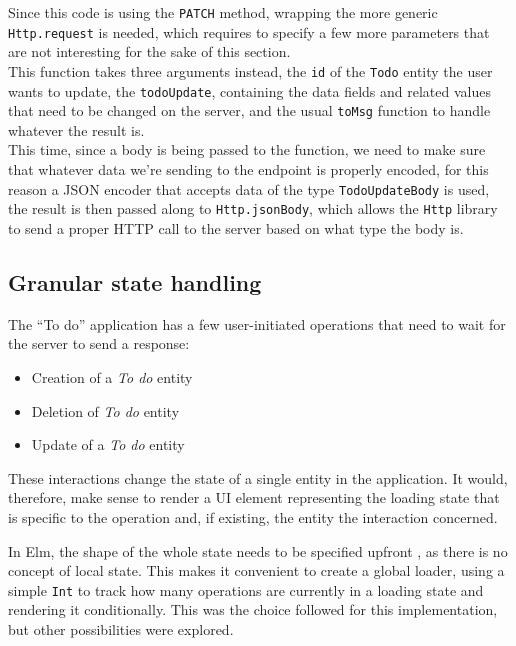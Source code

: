 \begin{sloppypar}
Since this code is using the \texttt{PATCH} method, wrapping the more generic \texttt{Http.request} is needed, which requires to specify a few more parameters that are not interesting for the sake of this section.\\
This function takes three arguments instead, the \texttt{id} of the \texttt{Todo} entity the user wants to update, the \texttt{todoUpdate}, containing the data fields and related values that need to be changed on the server, and the usual \texttt{toMsg} function to handle whatever the result is.\\
This time, since a body is being passed to the function, we need to make sure that whatever data we're sending to the endpoint is properly encoded, for this reason a JSON encoder that accepts data of the type \texttt{TodoUpdateBody} is used, the result is then passed along to \texttt{Http.jsonBody}, which allows the \texttt{Http} library to send a proper HTTP call to the server based on what type the body is.
\end{sloppypar}

\subsection{Granular state handling}
The ``To do'' application has a few user-initiated operations that need to wait for the server to send a response:
\begin{itemize}
    \item Creation of a \textit{To do} entity
    \item Deletion of \textit{To do} entity
    \item Update of a \textit{To do} entity
\end{itemize}
These interactions change the state of a single entity in the application. It would, therefore, make sense to render a UI element representing the loading state that is specific to the operation and, if existing, the entity the interaction concerned.

In Elm, the shape of the whole state needs to be specified upfront \cite{noauthor_elm_nodate}, as there is no concept of local state. This makes it convenient to create a global loader, using a simple \texttt{Int} to track how many operations are currently in a loading state and rendering it conditionally. This was the choice followed for this implementation, but other possibilities were explored.\\

